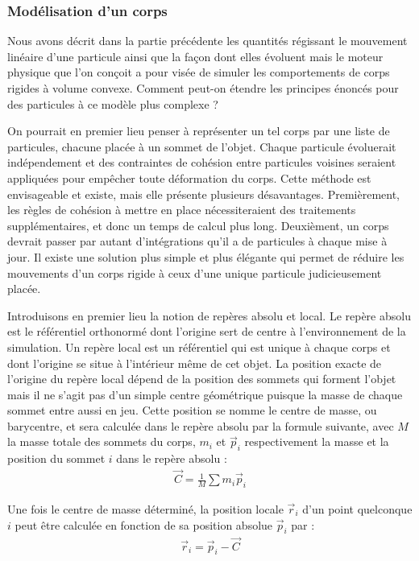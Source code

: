 \subsubsection{Modélisation d'un corps}

Nous avons décrit dans la partie précédente les quantités régissant le
mouvement linéaire d'une particule ainsi que la façon dont elles
évoluent mais le moteur physique que l'on conçoit a pour visée de
simuler les comportements de corps rigides à volume convexe. Comment
peut-on étendre les principes énoncés pour des particules à ce modèle
plus complexe ?

On pourrait en premier lieu penser à représenter un tel corps par une
liste de particules, chacune placée à un sommet de l'objet. Chaque
particule évoluerait indépendement et des contraintes de cohésion
entre particules voisines seraient appliquées pour empêcher toute
déformation du corps. Cette méthode est envisageable et existe, mais
elle présente plusieurs désavantages. Premièrement, les règles de
cohésion à mettre en place nécessiteraient des traitements
supplémentaires, et donc un temps de calcul plus long. Deuxièment, un
corps devrait passer par autant d'intégrations qu'il a de particules à
chaque mise à jour. Il existe une solution plus simple et plus
élégante qui permet de réduire les mouvements d'un corps rigide à ceux
d'une unique particule judicieusement placée.

Introduisons en premier lieu la notion de repères absolu et local. Le
repère absolu est le référentiel orthonormé dont l'origine sert de
centre à l'environnement de la simulation. Un repère local est un
référentiel qui est unique à chaque corps et dont l'origine se situe à
l'intérieur même de cet objet. La position exacte de l'origine du
repère local dépend de la position des sommets qui forment l'objet
mais il ne s'agit pas d'un simple centre géométrique puisque la masse
de chaque sommet entre aussi en jeu. Cette position se nomme le centre
de masse, ou barycentre, et sera calculée dans le repère absolu par la
formule suivante, avec $M$ la masse totale des sommets du corps, $m_i$
et $\vec{p}_i$ respectivement la masse et la position du sommet $i$
dans le repère absolu :
\begin{align*}
  \vec{C} = \frac{1}{M} \sum m_i \vec{p}_i
\end{align*}

Une fois le centre de masse déterminé, la position locale $\vec{r}_i$
d'un point quelconque $i$ peut être calculée en fonction de sa
position absolue $\vec{p}_i$ par :
\begin{align*}
  \vec{r}_i = \vec{p}_i - \vec{C}
\end{align*}

